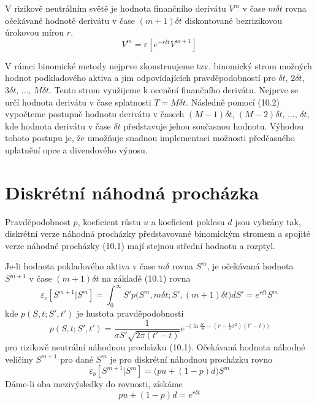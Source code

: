 \documentclass[a4paper]{book}
\begin{document}
V rizikově neutrálním světě je hodnota finančního derivátu $V^m$ v čase $m \delta t$ rovna očekávané hodnotě derivátu v čase $(m+1) \delta t$ diskontované bezrizikovou úrokovou mírou $r$.
\begin{equation}
V^m = \varepsilon[e^{-r \delta t}V^{m+1}]
\end{equation}

V rámci binomické metody nejprve zkonstruujeme tzv. binomický strom možných hodnot podkladového aktiva a jim odpovídajících pravděpodobností pro $\delta t$, $2 \delta t$, $3 \delta t$, ..., $M \delta t$. Tento strom využijeme k ocenění finančního derivátu. Nejprve se určí hodnota derivátu v čase splatnosti $T = M \delta t$. Následně pomocí (10.2) vypočteme postupně hodnotu derivátu v časech $(M-1) \delta t$, $(M-2) \delta t$, ..., $\delta t$, kde hodnota derivátu v čase $\delta t$ představuje jehou současnou hodnotu. Výhodou tohoto postupu je, že umožňuje snadnou implementaci možnosti předčasného uplatnění opce a divendového výnosu.

\section{Diskrétní náhodná procházka}

Pravděpodobnost $p$, koeficient růstu $u$ a koeficient poklesu $d$ jsou vybrány tak, diskrétní verze náhodná procházky představované binomickým stromem a spojité verze náhodné procházky (10.1) mají stejnou střední hodnotu a rozptyl.

Je-li hodnota pokladového aktiva v čase $m \delta$ rovna $S^m$, je očekávaná hodnota $S^{m+1}$ v čase $(m+1) \delta t$ na základě (10.1) rovna
\begin{equation*}
\varepsilon_c[S^{m+1}|S^m] = \int_0^{\infty} S' p \Big( S^m, m \delta t; S', (m+1)\delta t \Big) dS' = e^{r\delta t}S^m
\end{equation*}
kde $p(S,t; S', t')$ je hustota pravděpodobnosti
\begin{equation*}
p(S, t; S', t') = \frac{1}{\sigma S' \sqrt{2 \pi(t' - t)}}e^{- \Big( \ln \frac{S'}{S} - (r - \frac{1}{2}\sigma^2)(t'-t)\Big)}
\end{equation*}
pro rizikově neutrální náhodnou procházku (10.1). Očekávaná hodnota náhodné veličiny $S^{m+1}$ pro dané $S^m$ je pro diskrétní náhodnou procházku rovno
\begin{equation*}
\varepsilon_b[S^{m+1}|S^m] = \Big( pu + (1 - p)d \Big) S^m
\end{equation*}
Dáme-li oba mezivýsledky do rovnosti, získáme
\begin{equation}
pu + (1 - p)d = e^{r \delta t}
\end{equation}
\end{document}
